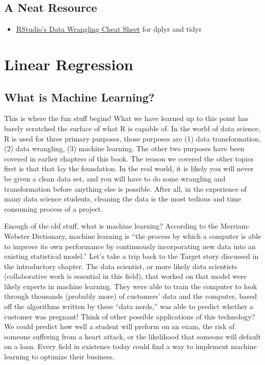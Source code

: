 \documentclass[
]{book}
\providecommand{\tightlist}{%
  \setlength{\itemsep}{0pt}\setlength{\parskip}{0pt}}
\begin{document}
\hypertarget{a-neat-resource}{%
\section{A Neat Resource}\label{a-neat-resource}}

\begin{itemize}
\tightlist
\item
  \href{http://www.rstudio.com/wp-content/uploads/2015/02/data-wrangling-cheatsheet.pdf}{RStudio's Data Wrangling Cheat Sheet} for dplyr and tidyr
\end{itemize}

\hypertarget{linear-regression}{%
\chapter{Linear Regression}\label{linear-regression}}

\hypertarget{what-is-machine-learning}{%
\section{What is Machine Learning?}\label{what-is-machine-learning}}

This is where the fun stuff begins! What we have learned up to this point has barely scratched the surface of what R is capable of. In the world of data science, R is used for three primary purposes, those purposes are (1) data transformation, (2) data wrangling, (3) machine learning. The other two purposes have been covered in earlier chapters of this book. The reason we covered the other topics first is that that lay the foundation. In the real world, it is likely you will never be given a clean data set, and you will have to do some wrangling and transformation before anything else is possible. After all, in the experience of many data science students, cleaning the data is the most tedious and time consuming process of a project.

Enough of the old stuff, what is machine learning? According to the Merriam-Webster Dictionary, machine learning is ``the process by which a computer is able to improve its own performance by continuously incorporating new data into an existing statistical model.'' Let's take a trip back to the Target story discussed in the introductory chapter. The data scientist, or more likely data scientists (collaborative work is essential in this field), that worked on that model were likely experts in machine learning. They were able to train the computer to look through thousands (probably more) of customers' data and the computer, based off the algorithms written by these ``data nerds,'' was able to predict whether a customer was pregnant! Think of other possible applications of this technology? We could predict how well a student will preform on an exam, the risk of someone suffering from a heart attack, or the likelihood that someone will default on a loan. Every field in existence today could find a way to implement machine learning to optimize their business.
\end{document}
